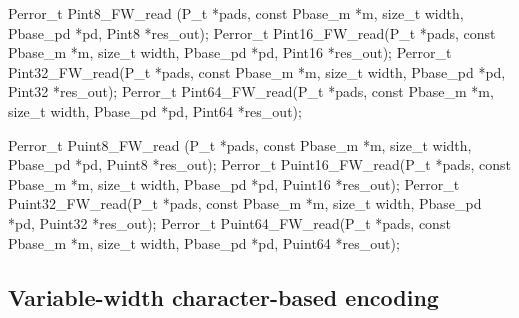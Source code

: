\begin{tinycodeaux}{\leftmargin=0in}
Perror_t Pint8_FW_read (P_t *pads, const Pbase_m *m, size_t width,
			Pbase_pd *pd, Pint8 *res_out);
Perror_t Pint16_FW_read(P_t *pads, const Pbase_m *m, size_t width,
			Pbase_pd *pd, Pint16 *res_out);
Perror_t Pint32_FW_read(P_t *pads, const Pbase_m *m, size_t width,
			Pbase_pd *pd, Pint32 *res_out);
Perror_t Pint64_FW_read(P_t *pads, const Pbase_m *m, size_t width,
			Pbase_pd *pd, Pint64 *res_out);

Perror_t Puint8_FW_read (P_t *pads, const Pbase_m *m, size_t width,
			 Pbase_pd *pd, Puint8 *res_out);
Perror_t Puint16_FW_read(P_t *pads, const Pbase_m *m, size_t width,
			 Pbase_pd *pd, Puint16 *res_out);
Perror_t Puint32_FW_read(P_t *pads, const Pbase_m *m, size_t width,
			 Pbase_pd *pd, Puint32 *res_out);
Perror_t Puint64_FW_read(P_t *pads, const Pbase_m *m, size_t width,
			 Pbase_pd *pd, Puint64 *res_out);
\end{tinycodeaux}

\subsection{Variable-width character-based encoding}

\aedBegin{}
\aedEnd{}

